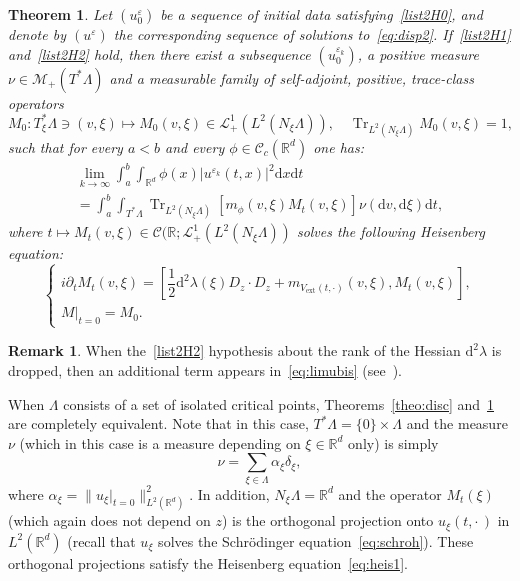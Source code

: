 \documentclass[10pt]{amsart}
\newtheorem{theo}[cdrthm]{Theorem}
\theoremstyle{definition}
\newtheorem{rema}[cdrthm]{Remark}
\DeclareMathOperator{\ext}{ext}
\DeclareMathOperator{\Trr}{Tr}
\newcommand*\R{{\mathbb R}}
\newcommand*\eps{\varepsilon}
\newcommand*\Tr{\Trr}
\numberwithin{equation}{section}
\newcommand*{\dd}{\mathrm{d}}
\newcommand*{\dt}{\dd t}
\newcommand*{\dx}{\dd x}
\newcommand*{\dv}{\dd v}
\newcommand*{\dxi}{\dd \xi}
\begin{document}
\begin{theo}\label{theo:nondis}
Let $(u^\eps_0)$ be a sequence of initial data satisfying~\eqref{list2H0}, and denote by $(u^\eps)$ the corresponding sequence of solutions to~\eqref{eq:disp2}. If~\eqref{list2H1} and~\eqref{list2H2} hold, then there exist a subsequence $(u^{\eps_k}_0)$, a positive measure $\nu\in\mathcal{M}_+(T^*\Lambda)$ and a measurable family of self-adjoint, positive, trace-class operators
\[
M_0:T^*_\xi\Lambda \ni (v,\xi)\longmapsto M_0(v,\xi)\in \mathcal{L}_+^1\left(L^2(N_\xi\Lambda)\right),\quad \Tr_{L^2(N_\xi\Lambda)} M_0(v,\xi)=1,
\]
such that for every $a<b$ and every $\phi\in \mathcal{C}_c(\R^d)$ one has:
\begin{multline}\label{eq:limubis}
\lim_{k\to\infty}\int_a^b\int_{\R^d}\phi(x)|u^{\eps_k}(t,x)|^2\dx\dt\\
=\int_a^b \int_{T^*\Lambda}\Tr_{L^2(N_\xi\Lambda)}\left[m_\phi(v,\xi)M_t(v,\xi)\right]\nu(\dv,\dxi)\dt,
\end{multline}
where $t\mapsto M_t(v,\xi)\in \mathcal{C}(\R;\mathcal{L}_+^1(L^2(N_\xi\Lambda))$ solves the following Heisenberg equation:
\begin{equation}\label{eq:heis1}
\begin{cases}
i\partial_t M_t(v,\xi) =\left[\dfrac{1}{2} \dd^2\lambda(\xi)D_z\cdot D_z + m_{V_{\ext}(t,\cdot)}(v,\xi), M_t(v,\xi)\right],\\
M |_{t=0}=M_0.
\end{cases}
\end{equation}
\end{theo}



\begin{rema}
When the~\eqref{list2H2} hypothesis about the rank of the Hessian $\dd^2\lambda$ is dropped, then an additional term appears in~\eqref{eq:limubis} (see~\cite{CFMProc}).
\end{rema}

When $\Lambda$ consists of a set of isolated critical points, Theorems~\ref{theo:disc} and~\ref{theo:nondis} are completely equivalent. Note that in this case, $T^*\Lambda=\{0\}\times\Lambda$ and the measure $\nu$ (which in this case is a measure depending on $\xi\in\R^d$ only) is simply
\[
\nu=\sum_{\xi\in\Lambda}\alpha_\xi\delta_\xi,
\]
where $\alpha_\xi = \|u_\xi|_{t=0}\|^2_{L^2(\R^d)}$. In addition, $N_\xi\Lambda=\R^d$ and the operator $M_t(\xi)$ (which again does not depend on $z$) is the orthogonal projection onto $u_\xi(t,\cdot\,)$ in $L^2(\R^d)$ (recall that $u_\xi$ solves the Schr\"odinger equation~\eqref{eq:schroh}). These orthogonal projections satisfy the Heisenberg equation~\eqref{eq:heis1}.
\end{document}
